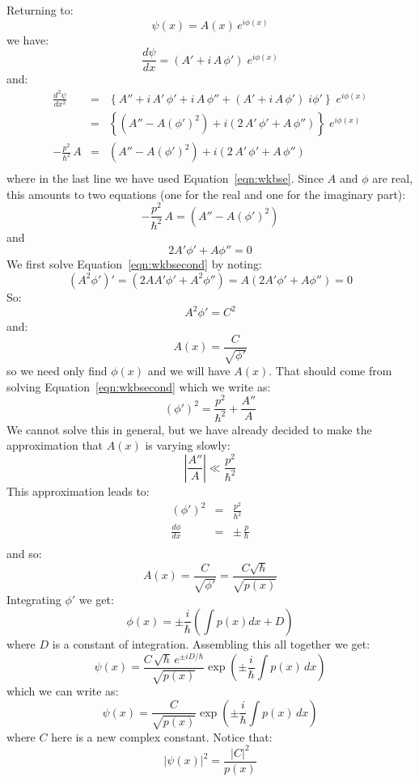 \documentclass[12pt]{book}
\begin{document}
Returning to:
$$\psi(x) = A(x) \, e^{\displaystyle i \phi(x)}$$
we have:
$$\frac{d\psi}{d x} = \left(A' + i\,A\,\phi'\right)\; e^{\displaystyle i \phi(x)}$$
and:
\begin{eqnarray*}
\frac{d^2 \psi}{d x^2} &=&  \left\{A'' + i\,A'\,\phi' + i\,A\,\phi''
+ \left(A' + i\,A\,\phi'\right)\; i \phi' \right\} \; e^{\displaystyle i \phi(x)} \\
&=& \left\{\left(A''-A\left(\phi'\right)^2\right) + i\left(2\,A'\,\phi' + A\,\phi''\right)\right\}\; e^{\displaystyle i \phi(x)} \\
-\frac{p^2}{\hbar^2}\,A&=& 
\left(A''-A\left(\phi'\right)^2\right) + i\left(2\,A'\,\phi' + A\,\phi''\right)\\
\end{eqnarray*}
where in the last line we have used Equation~\ref{eqn:wkbse}.  Since $A$ and $\phi$ are real, this amounts to two equations (one for the real and one for the imaginary part):
\begin{equation}
\label{eqn:wkbfirst}
-\frac{p^2}{\hbar^2}\,A = \left(A''-A\left(\phi'\right)^2\right)
\end{equation}
and
\begin{equation}
\label{eqn:wkbsecond}
2A'\phi'+A\phi'' = 0
\end{equation}
We first solve Equation~\ref{eqn:wkbsecond} by noting:
$$\left(A^2\phi'\right)' = \left(2AA'\phi'+A^2\phi''\right) = A \left(2A'\phi'+A\phi''\right) = 0$$
So:
$$A^2 \phi' = C^2$$
and:
$$A(x) = \frac{C}{\sqrt{\phi'}}$$
so we need only find $\phi(x)$ and we will have $A(x)$.  That should come from solving Equation~\ref{eqn:wkbsecond} which we write as:
$$\left(\phi'\right)^2 = \frac{p^2}{\hbar^2} + \frac{A''}{A}$$
We cannot solve this in general, but we have already decided to make the approximation that $A(x)$ is varying slowly:
$$\left| \frac{A''}{A} \right| \ll \frac{p^2}{\hbar^2} $$
This approximation leads to:
\begin{eqnarray*}
\left(\phi'\right)^2 &=& \frac{p^2}{\hbar^2}\\
\frac{d\phi}{dx} &=& \pm \, \frac{p}{\hbar}\\
\end{eqnarray*}
and so:
$$A(x) = \frac{C}{\sqrt{\phi'}} = \frac{C\sqrt{\hbar}}{\sqrt{p(x)}}$$
Integrating $\phi'$ we get:
$$\phi(x) = \pm \frac{i}{\hbar} \left( \int p(x) dx + D\right)$$
where $D$ is a constant of integration.  Assembling this all together we get:
$$\psi(x) = \frac{C \, \sqrt{\hbar} \, e^{\pm iD/\hbar}}{\sqrt{p(x)}} \exp\left(\pm\frac{i}{\hbar}\int p(x) \, dx \right)$$
which we can write as:
\begin{equation}
\psi(x) = \frac{C}{\sqrt{p(x)}} \exp\left(\pm\frac{i}{\hbar}\int p(x) \, dx \right)
\end{equation}
where $C$ here is a new complex constant.  Notice that:
$$|\psi(x)|^2 = \frac{|C|^2}{p(x)}$$
\end{document}

